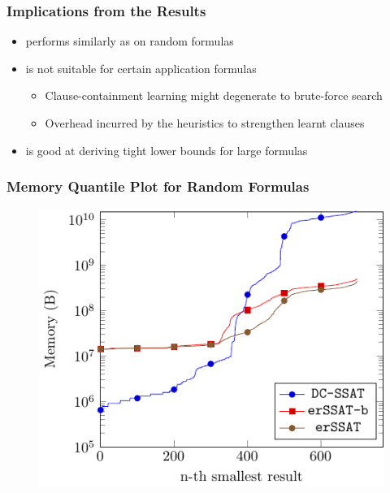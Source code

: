 \begin{frame}
    \frametitle{Implications from the Results}
    \begin{itemize}
        \item \erssat performs similarly as \dcssat on random formulas
              \pause
        \item \erssat is not suitable for certain application formulas
              \begin{itemize}
                  \item Clause-containment learning might degenerate to brute-force search
                  \item Overhead incurred by the heuristics to strengthen learnt clauses
              \end{itemize}
              \pause
        \item \erssat is good at deriving tight lower bounds for large formulas
    \end{itemize}
\end{frame}

\iffalse
    \begin{frame}
        \frametitle{Memory Quantile Plot for Random Formulas}
        \begin{figure}
            \centering
            \includegraphics{fig/exist-random-ssat/quantile-memory-Random.pdf}
        \end{figure}
    \end{frame}

